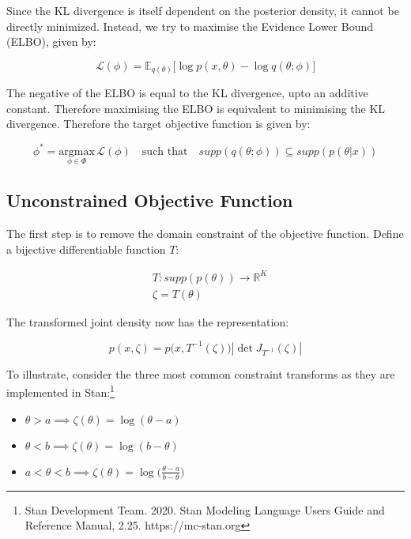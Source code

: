 \documentclass[10pt]{article}
\begin{document}
Since the KL divergence is itself dependent on the posterior density, it cannot be directly minimized. Instead, we try 
to maximise the Evidence Lower Bound (ELBO), given by:

\begin{equation*}
  \mathcal{L}(\phi) = \mathbb{E}_{q(\theta)}\big[\log p(x, \theta) - \log q(\theta;\phi) \big]
\end{equation*}

The negative of the ELBO is equal to the KL divergence, upto an additive constant. Therefore maximising the ELBO is 
equivalent to minimising the KL divergence. Therefore the target objective function is given by:

\begin{equation*}
  \phi^* = \underset{\phi \in \Phi}{\text{argmax}}\, \mathcal{L}(\phi) \quad \text{such that} \quad supp(q(\theta ; \phi)) \subseteq supp(p(\theta | x))
\end{equation*}

\subsection*{Unconstrained Objective Function}

The first step is to remove the domain constraint of the objective function. Define a bijective differentiable function $T$:

\begin{align*}
  &T : supp(p(\theta)) \to \mathbb{R}^K \\
  &\zeta = T(\theta)
\end{align*}

The transformed joint density now has the representation:

\begin{equation*}
  p(x, \zeta) = p\big(x, T^{-1}(\zeta)\big)|\det J_{T^{-1}}(\zeta)| 
\end{equation*}

To illustrate, consider the three most common constraint transforms as they are implemented in Stan:\footnote{Stan Development Team. 2020. Stan Modeling Language Users Guide and Reference Manual, 2.25. https://mc-stan.org}

\begin{itemize}
  \item $\theta > a \implies \zeta(\theta) = \log(\theta - a)$
  \item $\theta < b \implies \zeta(\theta) = \log(b - \theta)$
  \item $a < \theta < b \implies \zeta(\theta) = \log\big(\frac{\theta - a}{b - \theta}\big)$
\end{itemize}
\end{document}
